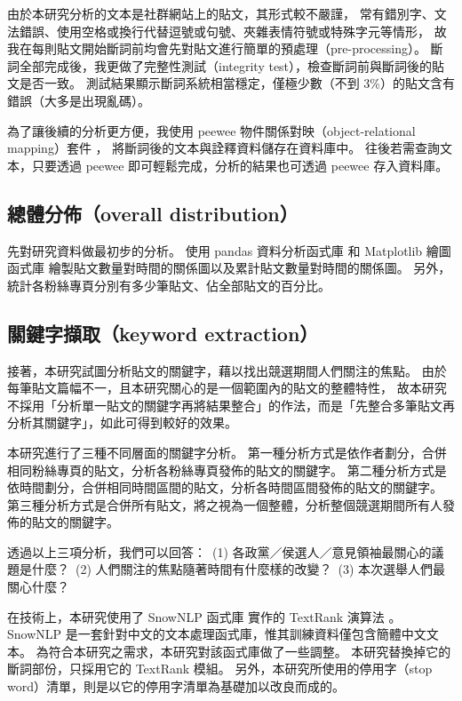 \documentclass[letterpaper, 10pt, conference]{ieeeconf}   %
\begin{document}
\begin{CJK}{UTF8}{bsmi}
由於本研究分析的文本是社群網站上的貼文，其形式較不嚴謹，%
常有錯別字、文法錯誤、使用空格或換行代替逗號或句號、夾雜表情符號或特殊字元等情形，%
故我在每則貼文開始斷詞前均會先對貼文進行簡單的預處理（pre-processing）。%
斷詞全部完成後，我更做了完整性測試（integrity test），檢查斷詞前與斷詞後的貼文是否一致。%
測試結果顯示斷詞系統相當穩定，僅極少數（不到 3\%）的貼文含有錯誤（大多是出現亂碼）。%

為了讓後續的分析更方便，我使用 peewee 物件關係對映（object-relational mapping）套件 \cite{c8}，%
將斷詞後的文本與詮釋資料儲存在資料庫中。%
往後若需查詢文本，只要透過 peewee 即可輕鬆完成，分析的結果也可透過 peewee 存入資料庫。%

\subsection*{總體分佈（overall distribution）}

先對研究資料做最初步的分析。%
使用 pandas 資料分析函式庫 \cite{c9} 和 Matplotlib 繪圖函式庫 \cite{c10} %
繪製貼文數量對時間的關係圖以及累計貼文數量對時間的關係圖。%
另外，統計各粉絲專頁分別有多少筆貼文、佔全部貼文的百分比。%

\subsection*{關鍵字擷取（keyword extraction）}

接著，本研究試圖分析貼文的關鍵字，藉以找出競選期間人們關注的焦點。%
由於每筆貼文篇幅不一，且本研究關心的是一個範圍內的貼文的整體特性，%
故本研究不採用「分析單一貼文的關鍵字再將結果整合」的作法，而是「先整合多筆貼文再分析其關鍵字」，如此可得到較好的效果。%

本研究進行了三種不同層面的關鍵字分析。%
第一種分析方式是依作者劃分，合併相同粉絲專頁的貼文，分析各粉絲專頁發佈的貼文的關鍵字。%
第二種分析方式是依時間劃分，合併相同時間區間的貼文，分析各時間區間發佈的貼文的關鍵字。%
第三種分析方式是合併所有貼文，將之視為一個整體，分析整個競選期間所有人發佈的貼文的關鍵字。%

透過以上三項分析，我們可以回答：%
\,(1) 各政黨／侯選人／意見領袖最關心的議題是什麼？%
\,(2) 人們關注的焦點隨著時間有什麼樣的改變？%
\,(3) 本次選舉人們最關心什麼？%

在技術上，本研究使用了 SnowNLP 函式庫 \cite{c11} 實作的 TextRank 演算法 \cite{c12}。%
SnowNLP 是一套針對中文的文本處理函式庫，惟其訓練資料僅包含簡體中文文本。%
為符合本研究之需求，本研究對該函式庫做了一些調整。%
本研究替換掉它的斷詞部份，只採用它的 TextRank 模組。%
另外，本研究所使用的停用字（stop word）清單，則是以它的停用字清單為基礎加以改良而成的。%


\end{CJK}
\end{document}
